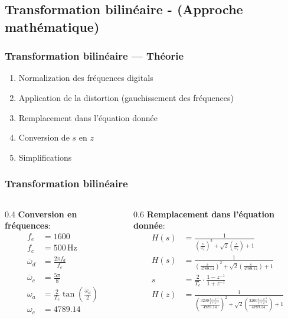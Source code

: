\subsection{Transformation bilinéaire - (Approche mathématique)}


\begin{frame}
\frametitle{Transformation bilinéaire — Théorie}
\begin{enumerate}
    \item Normalization des fréquences digitals
    \item Application de la distortion (gauchissement des fréquences)
	\item Remplacement dans l'équation donnée
	\item Conversion de $s$ en $z$
	\item Simplifications
\end{enumerate}
\end{frame}

\begin{frame}
	\frametitle{Transformation bilinéaire}
	\begin{columns}[t]
		\begin{column}{0.4\textwidth}
			\textbf{Conversion en fréquences}:
			\footnotesize{\begin{align}
				f_e &= 1600 \nonumber \\
				f_c &= 500\,\text{Hz} \nonumber \\
		    \bar{\omega}_d&=\frac{2\pi f_d}{f_e} \\
				\bar\omega_c&=\frac{5\pi}{8} \\
				\omega_a&=\frac{2}{T_e}\tan\left(\frac{\bar\omega_d}{2}\right) \\
				\omega_c&=4789.14 \nonumber
			\end{align}}

		\end{column}
		\begin{column}{0.6\textwidth}
			\textbf{Remplacement dans l'équation donnée}:
			\footnotesize{\begin{align}
				H(s)&=\frac{1}{(\frac{s}{\omega_c})^2+\sqrt2(\frac{s}{\omega_c})+1} \\
				H(s)&=\frac{1}{(\frac{s}{4789.14})^2+\sqrt2(\frac{s}{4789.14})+1} \\
				s&=\frac{2}{T_e}\cdot\frac{1-z^{-1}}{1+z^{-1}} \\
				H(z)&=\frac{1}{
				(\frac{
				3200\frac{1-z^{-1}}{1+z^{-1}}}
				{4789.14})^2
				+\sqrt2
				(\frac{
				3200\frac{1-z^{-1}}{1+z^{-1}}
				}{4789.14})
				+1}
			\end{align}}

		\end{column}
	\end{columns}
\end{frame}

